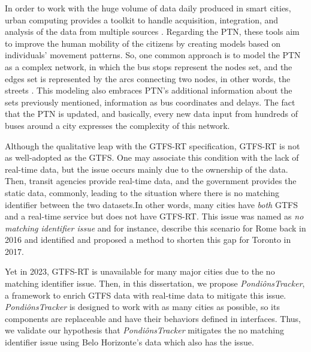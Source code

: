 In order to work with the huge volume of data daily produced in smart cities, 
urban computing provides a toolkit to handle acquisition, integration, and 
analysis of the data from multiple sources \cite{urban_computing}.
Regarding the PTN, these tools aim to improve the human mobility
of the citizens by creating models based on individuals' movement patterns.
So, one common approach is to model the PTN as a complex network, in which 
the bus stops represent the nodes set, and the edges set is represented 
by the arcs connecting two nodes, in other words, the streets \cite{ferber2012}. 
This modeling also embraces PTN's additional information about the
sets previously mentioned, information as bus coordinates and delays.
The fact that the PTN is updated, and basically, every new data input
from hundreds of buses around a city
expresses the complexity of this network.

Although the qualitative leap with the GTFS-RT specification, GTFS-RT
is not as well-adopted as the GTFS. One may associate this condition with
the lack of real-time data, but the issue occurs mainly due to the ownership of the data.
Then, transit agencies provide real-time data, and the government provides the static data, commonly, 
leading to the situation where there is no matching identifier 
between the two datasets.In other words, many cities have {\em both} GTFS and a real-time service 
but does not have GTFS-RT. This issue was named as {\em no matching identifier issue} and
for instance, 
 describe this scenario for Rome back in 2016
and  identified and proposed a method to 
shorten this gap for Toronto in 2017. 

Yet in 2023,
GTFS-RT is unavailable for many major cities due 
to the no matching identifier issue. Then,
in this dissertation, we propose \textit{PondiônsTracker}, a framework
to enrich GTFS data with real-time data to mitigate this issue. 
\textit{PondiônsTracker} is designed to work with as many cities as possible, so its components
are replaceable and have their behaviors defined in interfaces. Thus, we validate our hypothesis that
\textit{PondiônsTracker} mitigates the no matching identifier issue using Belo Horizonte's
data which also has the issue.




